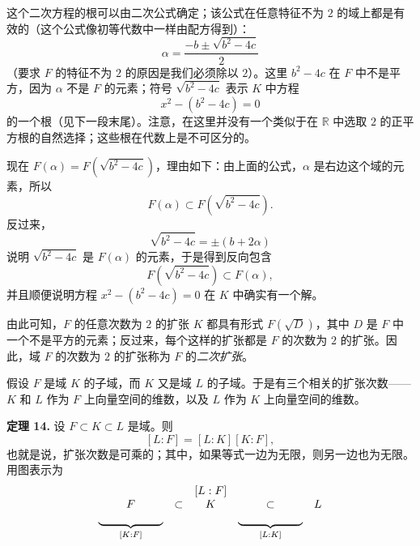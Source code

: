 这个二次方程的根可以由二次公式确定；该公式在任意特征不为 $2$ 的域上都是有效的（这个公式像初等代数中一样由配方得到）：
\[
\alpha=\frac{-b\pm\sqrt{b^2-4c}}{2}
\]
（要求 $F$ 的特征不为 $2$ 的原因是我们必须除以 $2$）。这里 $b^2-4c$ 在 $F$ 中不是平方，因为 $\alpha$ 不是 $F$ 的元素；符号 $\sqrt{b^2-4c}$ 表示 $K$ 中方程
\[
x^2-(b^2-4c)=0
\]
的一个根（见下一段末尾）。注意，在这里并没有一个类似于在 $\mathbb R$ 中选取 $2$ 的正平方根的自然选择；这些根在代数上是不可区分的。

现在 $F(\alpha)=F(\sqrt{b^2-4c})$，理由如下：由上面的公式，$\alpha$ 是右边这个域的元素，所以
\[
F(\alpha)\subset F(\sqrt{b^2-4c}).
\]
反过来，
\[
\sqrt{b^2-4c}=\pm(b+2\alpha)
\]
说明 $\sqrt{b^2-4c}$ 是 $F(\alpha)$ 的元素，于是得到反向包含
\[
F(\sqrt{b^2-4c})\subset F(\alpha),
\]
并且顺便说明方程 $x^2-(b^2-4c)=0$ 在 $K$ 中确实有一个解。

由此可知，$F$ 的任意次数为 $2$ 的扩张 $K$ 都具有形式 $F(\sqrt D)$，其中 $D$ 是 $F$ 中一个不是平方的元素；反过来，每个这样的扩张都是 $F$ 的次数为 $2$ 的扩张。因此，域 $F$ 的次数为 $2$ 的扩张称为 $F$ 的\emph{二次扩张}。

假设 $F$ 是域 $K$ 的子域，而 $K$ 又是域 $L$ 的子域。于是有三个相关的扩张次数——$K$ 和 $L$ 作为 $F$ 上向量空间的维数，以及 $L$ 作为 $K$ 上向量空间的维数。

\noindent\textbf{定理 14.} 设 $F\subset K\subset L$ 是域。则
\[
[L:F]=[L:K][K:F],
\]
也就是说，扩张次数是可乘的；其中，如果等式一边为无限，则另一边也为无限。用图表示为
\[
\begin{array}{ccccc}
	& & [L:F] & & \\
	F & \subset & K & \subset & L\\
	\underbrace{\hspace{2.0cm}}_{[K:F]} & & & \underbrace{\hspace{2.0cm}}_{[L:K]}
\end{array}
\]

